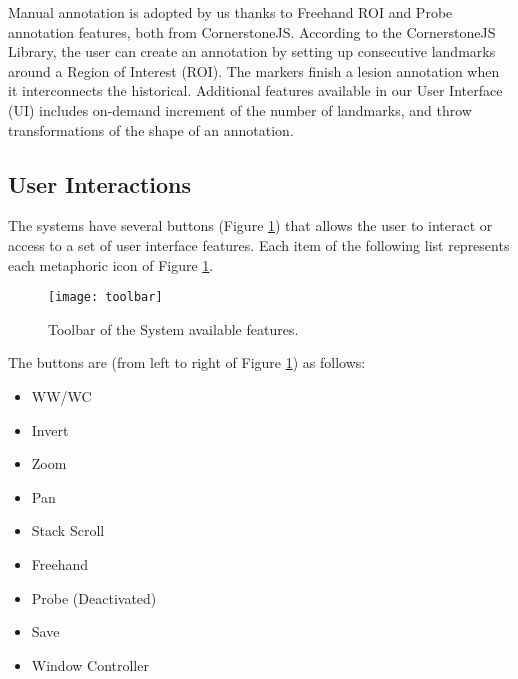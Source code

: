 Manual annotation is adopted by us thanks to Freehand ROI and Probe annotation features, both from CornerstoneJS. According to the CornerstoneJS Library, the user can create an annotation by setting up consecutive landmarks around a Region of Interest (ROI). The markers finish a lesion annotation when it interconnects the historical. Additional features available in our User Interface (UI) includes on-demand increment of the number of landmarks, and throw transformations of the shape of an annotation.

\clearpage


\subsection{User Interactions}

The systems have several buttons (Figure \ref{fig:toolbar}) that allows the user to interact or access to a set of user interface features. Each item of the following list represents each metaphoric icon of Figure \ref{fig:toolbar}.


\hfill

\begin{figure}[h]
\centering
\texttt{[image: toolbar]}
\caption{Toolbar of the System available features.}
\label{fig:toolbar}
\end{figure}

\hfill


\hfill

The buttons are (from left to right of Figure \ref{fig:toolbar}) as follows:

\hfill

\begin{itemize}
\item WW/WC
\item Invert
\item Zoom
\item Pan
\item Stack Scroll
\item Freehand
\item Probe (Deactivated)
\item Save
\item Window Controller
\end{itemize}

